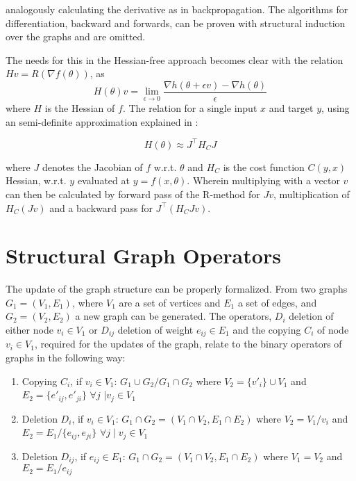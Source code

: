 \noindent
analogously calculating the derivative as in backpropagation. The algorithms for differentiation, backward and forwards, can be proven with structural induction over the graphs and are omitted. 

The needs for this in the Hessian-free approach becomes clear with the relation $Hv = R(\nabla f(\theta))$, as \[H(\theta)v = \lim_{\epsilon\to 0} \frac{\nabla h(\theta + \epsilon v) - \nabla h(\theta)}{\epsilon} \] where $H$ is the Hessian of $f$. The relation for a single input $x$ and target $y$, using an semi-definite approximation explained in \cite{Martens2012}:

\[H(\theta) \approx J^\intercal H_C J \]

\noindent
where $J$ denotes the Jacobian of $f$ w.r.t. $\theta$ and $H_C$ is the cost function $C(y, x)$ Hessian, w.r.t. $y$ evaluated at $y=f(x,\theta)$. Wherein multiplying with a vector $v$ can then be calculated by forward pass of the R-method for $Jv$, multiplication of $H_C(Jv)$ and a backward pass for $J^\intercal(H_CJv)$.

\section{Structural Graph Operators}

The update of the graph structure can be properly formalized. From two graphs $G_1 = (V_1,E_1)$, where $V_1$ are a set of vertices and $E_1$ a set of edges, and $G_2 = (V_2, E_2)$ a new graph can be generated. The operators, $D_i$ deletion of either node $v_i \in V_1$ or $D_{ij}$ deletion of weight $e_{ij} \in E_1$ and the copying $C_i$ of node $v_i \in V_1$, required for the updates of the graph, relate to the binary operators of graphs in the following way:

\begin{enumerate}
    \item Copying $C_i$, if $v_i \in V_1$: $G_1 \cup G_2 / G_1 \cap G_2$ where $V_2 = \{v'_i\} \cup V_1$ and $E_2 = \{e'_{ij}, e'_{ji}\}$ $\forall j$ $\mid v_j \in V_1$
    \item Deletion $D_i $, if $v_i \in V_1$: $G_1 \cap G_2 = (V_1 \cap V_2, E_1 \cap E_2)$ where $V_2 = V_1 / v_i$ and $E_2 = E_1 / \{e_{ij}, e_{ji}\} $ $ \forall j \mid v_j \in V_1 $
    \item Deletion $D_{ij}$, if $e_{ij} \in E_1$: $G_1 \cap G_2 = (V_1 \cap V_2, E_1 \cap E_2)$ where $V_1 = V_2$ and $E_2 = E_1 / e_{ij}$
\end{enumerate}


